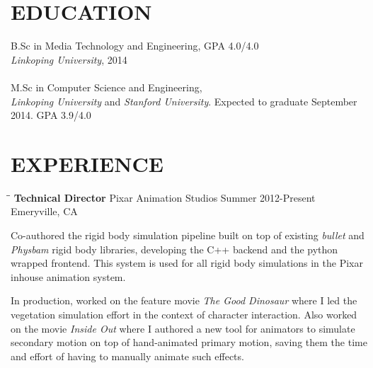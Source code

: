 \documentclass{res}
\begin{document}
 


\address{\bf  PRESENT ADDRESS\\995 36th St\\Emeryville, CA 94608\\+1 650 283-7222}
\address{\bf PERMANENT ADDRESS \\ Bonared Vastergarden 6 \\51198 Hyssna, Sweden \\ +46 320 39261}

\begin{resume}      

\section{EDUCATION}
    B.Sc in Media Technology and Engineering, GPA 4.0/4.0\\ \emph{Linkoping University}, 2014 \\  \\
    M.Sc in Computer Science and Engineering, \\ \emph{Linkoping University} and \emph{Stanford University}. Expected to graduate September 2014. GPA 3.9/4.0
 
\section{EXPERIENCE}
   \vspace{-0.1in}	
   \begin{tabbing}
   \hspace{2.3in}\= \hspace{2.4in}\= \kill %
    {\bf Technical Director} \>Pixar Animation Studios     \>Summer 2012-Present\\
                             \>Emeryville, CA
   \end{tabbing}\vspace{-20pt}      %
    Co-authored the rigid body simulation pipeline built on top of existing \emph{bullet} and \emph{Physbam} rigid body libraries, developing the C++ backend and the python wrapped frontend. This system is used for all rigid body simulations in the Pixar inhouse animation system.

   In production, worked on the feature movie \emph{The Good Dinosaur} where I led the vegetation simulation effort in the context of character interaction. Also worked on the movie \emph{Inside Out} where I authored a new tool for animators to simulate secondary motion on top of hand-animated primary motion, saving them the time and effort of having to manually animate such effects.


\end{resume}
\end{document}
